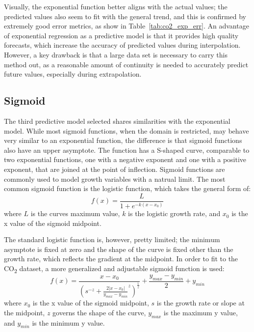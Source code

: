 \documentclass[12pt]{mcmthesis}
\begin{document}
    Visually, the exponential function better aligns with the actual values; the predicted values also seem to fit with the general trend, and this is confirmed by extremely good error metrics, as show in Table~\ref{tab:co2_exp_err}.
    An advantage of exponential regression as a predictive model is that it provides high quality forecasts, which increase the accuracy of predicted values during interpolation.
    However, a key drawback is that a large data set is necessary to carry this method out, as a reasonable amount of continuity is needed to accurately predict future values, especially during extrapolation.

    \subsection{Sigmoid}
    The third predictive model selected shares similarities with the exponential model.
    While most sigmoid functions, when the domain is restricted, may behave very similar to an exponential function, the difference is that sigmoid functions also have an upper asymptote.
    The function has a S-shaped curve, comparable to two exponential functions, one with a negative exponent and one with a positive exponent, that are joined at the point of inflection.
    Sigmoid functions are commonly used to model growth variables with a natrual limit.
    The most common sigmoid function is the logistic function, which takes the general form of:
%
    \begin{equation}
        f(x) = \frac{L}{1 + e^{-k(x - x_0)}}
        \label{eq:logi}
    \end{equation}
%
    where
    $L$ is the curve\textquotesingle s maximum value,
    $k$ is the logistic growth rate, and
    $x_0$ is the x value of the sigmoid midpoint.

    The standard logistic function is, however, pretty limited; the minimum asymptote is fixed at zero and the shape of the curve is fixed other than the growth rate, which reflects the gradient at the midpoint.
    In order to fit to the CO\textsubscript{2} dataset, a more generalized and adjustable sigmoid function is used:
%
    \begin{equation}
        f(x) = \frac{x-x_{0}}{\left(s^{-z}+\frac{2\left|x-x_{0}\right|}{y_{max}-y_{min}}^{z}\right)^{\frac{1}{z}}}+\frac{y_{max}-y_{min}}{2}+y_{min}
    \end{equation}
%
    where
    $x_0$ is the x value of the sigmoid midpoint,
    $s$ is the growth rate or slope at the midpoint,
    $z$ governs the shape of the curve,
    $y_{max}$ is the maximum y value, and
    $y_{min}$ is the minimum y value.
\end{document}
